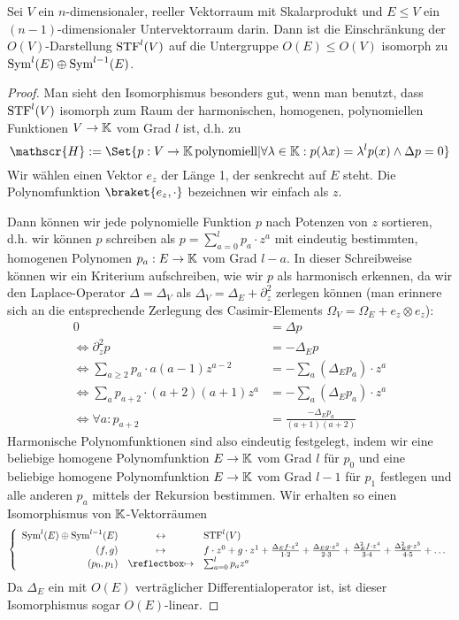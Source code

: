 
\begin{lemma}
Sei $V$ ein $n$-dimensionaler, reeller Vektorraum mit Skalarprodukt und $E\leq V$ ein $(n-1)$-dimensionaler Untervektorraum darin. Dann ist die Einschränkung der $O(V)$-Darstellung $\operatorname{STF}^l(V)$ auf die Untergruppe $O(E) \leq O(V)$ isomorph zu $\operatorname{Sym}^l(E) \oplus \operatorname{Sym}^{l-1}(E)$.
\end{lemma}
\begin{proof}
Man sieht den Isomorphismus besonders gut, wenn man benutzt, dass $\operatorname{STF}^l(V)$ isomorph zum Raum der harmonischen, homogenen, polynomiellen Funktionen $V\to\mathbb{K}$ vom Grad $l$ ist, d.h. zu
\[\mathscr{H} := \Set{p: V\to\IK \,\text{polynomiell} | \forall\lambda\in\IK: p(\lambda x) = \lambda^l p(x) \wedge \Delta p = 0}\]
Wir wählen einen Vektor $e_z$ der Länge 1, der senkrecht auf $E$ steht. Die Polynomfunktion $\braket{e_z,\cdot}$ bezeichnen wir einfach als $z$.

Dann können wir jede polynomielle Funktion $p$ nach Potenzen von $z$ sortieren, d.h. wir können $p$ schreiben als $p = \sum_{a=0}^l p_a \cdot z^a$ mit eindeutig bestimmten, homogenen Polynomen $p_a: E\to\mathbb{K}$ vom Grad $l-a$. In dieser Schreibweise können wir ein Kriterium aufschreiben, wie wir $p$ als harmonisch erkennen, da wir den Laplace-Operator $\Delta=\Delta_V$ als $\Delta_V = \Delta_E + \partial_z^2$ zerlegen können (man erinnere sich an die entsprechende Zerlegung des Casimir-Elements $\Omega_V=\Omega_E + e_z\otimes e_z$):
\begin{align*}
0 &= \Delta p \\
\iff \partial_z^2 p &= -\Delta_ E p \\
\iff \sum_{a\geq 2} p_a \cdot a(a-1)z^{a-2} &= -\sum_a (\Delta_E p_a)\cdot z^a \\
\iff \sum_a p_{a+2}\cdot  (a+2)(a+1)z^a &= -\sum_a (\Delta_E p_a)\cdot z^a \\
\iff \forall a: p_{a+2} &= \frac{-\Delta_E p_a}{(a+1)(a+2)}
\end{align*}
Harmonische Polynomfunktionen sind also eindeutig festgelegt, indem wir eine beliebige homogene Polynomfunktion $E\to\mathbb{K}$ vom Grad $l$ für $p_0$ und eine beliebige homogene Polynomfunktion $E\to\mathbb{K}$ vom Grad $l-1$ für $p_1$ festlegen und alle anderen $p_a$ mittels der Rekursion bestimmen. Wir erhalten so einen Isomorphismus von $\mathbb{K}$-Vektorräumen
\[\left\lbrace\begin{array}{rcl}
\Sym^l(E) \oplus \Sym^{l-1}(E) &\leftrightarrow& \STF^l(V) \\
(f,g) &\mapsto& f\cdot z^0 + g\cdot z^1 + \frac{\Delta_E f\cdot z^2}{1\cdot 2} + \frac{\Delta_Eg\cdot z^3}{2\cdot 3} + \frac{\Delta_E^2 f \cdot z^4}{3\cdot 4} + \frac{\Delta_E^2 g \cdot z^5}{4\cdot 5 } + \ldots \\
(p_0,p_1) &\mapsfrom& \sum_{a=0}^l p_a z^a
\end{array}\right.\]
Da $\Delta_E$ ein mit $O(E)$ verträglicher Differentialoperator ist, ist dieser Isomorphismus sogar $O(E)$-linear.
\end{proof}

